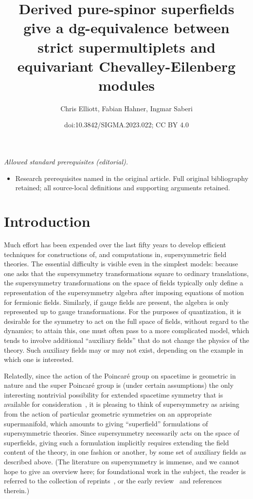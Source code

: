 \documentclass[10pt,a4paper]{amsart}
\title{Derived pure-spinor superfields give a dg-equivalence between strict supermultiplets and equivariant Chevalley-Eilenberg modules}
\author{Chris Elliott, Fabian Hahner, Ingmar Saberi}
\date{doi:10.3842/SIGMA.2023.022; CC BY 4.0}
\numberwithin{equation}{section}
\begin{document}
\maketitle
\noindent\textit{Allowed standard prerequisites (editorial).}\begin{itemize}
\item Research prerequisites named in the original article. Full original bibliography retained; all source-local definitions and supporting arguments retained.
\end{itemize}\medskip
\section{Introduction}

Much effort has been expended over the last fifty years to develop efficient techniques for constructions of, and computations in, supersymmetric field theories. The essential difficulty is visible even in the simplest models: because one asks that the supersymmetry transformations square to ordinary translations, the supersymmetry transformations on the space of fields typically only define a representation of the supersymmetry algebra after imposing equations of motion for fermionic fields. Similarly, if gauge fields are present, the algebra is only represented up to gauge transformations.
For the purposes of quantization, it is desirable for the symmetry to act on the full space of fields, without regard to the dynamics; to attain this, one must often pass to a more complicated model, which tends to involve additional ``auxiliary fields'' that do not change the physics of the theory. Such auxiliary fields may or may not exist, depending on the example in which one is interested.

Relatedly, since the action of the Poincar\'e group on spacetime is geometric in nature and the super Poincar\'e group is (under certain assumptions) the only interesting nontrivial possibility for extended spacetime symmetry that is available for consideration~\cite{HLS}, it is pleasing to think of supersymmetry as arising from the action of particular geometric symmetries on an appropriate supermanifold, which amounts to giving ``superfield'' formulations of supersymmetric theories.
Since supersymmetry necessarily acts on the space of superfields, giving such a formulation implicitly requires extending the field content of the theory, in one fashion or another, by some set of auxiliary fields as described above.
(The literature on supersymmetry is immense, and we cannot hope to give an overview here; for foundational work in the subject, the reader is referred to the collection of reprints~\cite{FerraraBook}, or the early review~\cite{Sohnius} and references therein.)
\end{document}
